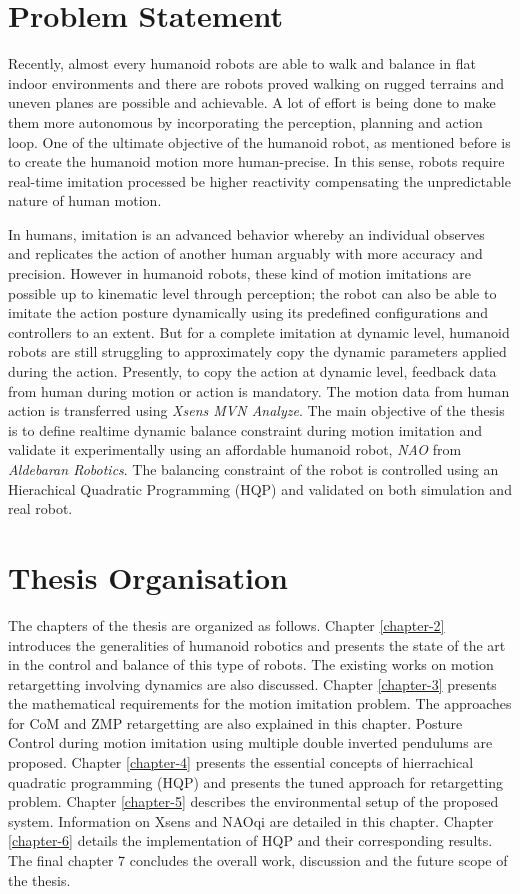 \section{Problem Statement}

Recently, almost every humanoid robots are able to walk and balance in flat indoor environments and there are robots 
proved walking on rugged terrains and uneven planes are possible and achievable. A lot of effort is being done to make
them more autonomous by incorporating the perception, planning and action loop. One of the ultimate objective of the 
humanoid robot, as mentioned before is to create the humanoid motion more human-precise. In this sense, robots require 
real-time imitation processed be higher reactivity compensating the unpredictable nature of human motion.

 

In humans, imitation is an advanced behavior whereby an individual observes and replicates the action of another 
human arguably with more accuracy and precision. However in humanoid robots, these kind of motion imitations are possible
up to kinematic level through perception; the robot can also be able to imitate the action posture dynamically using its predefined 
configurations and controllers to an extent. But for a complete imitation at dynamic level, humanoid robots are still struggling to 
approximately copy the dynamic parameters applied during the action. Presently, to copy the action at dynamic level, 
feedback data from human during motion or action is mandatory. The motion data from human action is transferred using 
\textit{Xsens MVN Analyze}. The main objective of the thesis is to define realtime dynamic balance constraint during
motion imitation and validate it experimentally using an affordable humanoid robot, \textit{NAO} from \textit{Aldebaran
Robotics}. The balancing constraint of the robot is controlled using an Hierachical Quadratic Programming (HQP) and validated on both 
simulation and real robot.

\section{Thesis Organisation}


The chapters of the thesis are organized as follows. Chapter \ref{chapter-2} introduces the generalities of humanoid robotics and presents
the state of the art in the control and balance of this type of robots. The existing works on motion retargetting involving dynamics are also 
discussed. Chapter \ref{chapter-3} presents the mathematical requirements for the motion imitation problem. The approaches for CoM and ZMP
retargetting are also explained in this chapter. Posture Control during motion imitation using multiple double inverted pendulums are proposed.
Chapter \ref{chapter-4} presents the essential concepts of hierrachical quadratic programming (HQP) and presents the tuned approach for
retargetting problem. Chapter \ref{chapter-5} describes the environmental setup of the proposed system. Information on Xsens and NAOqi are 
detailed in this chapter. Chapter \ref{chapter-6} details the implementation of HQP and their corresponding results. The final chapter 7 
concludes the overall work, discussion and the future scope of the thesis.